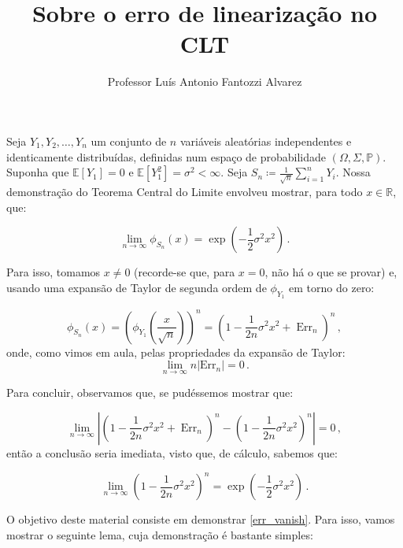 \documentclass[12pt,a4paper]{article}
\title{Sobre o erro de linearização no CLT}
\author{ Professor Luís Antonio Fantozzi Alvarez}
\begin{document}
	\maketitle
	Seja $Y_1,Y_2,\ldots, Y_n$ um conjunto de $n$ variáveis aleatórias independentes e identicamente distribuídas, definidas num espaço de probabilidade $(\Omega, \Sigma,\mathbb{P})$. Suponha que $\mathbb{E}[Y_1]=0$ e $\mathbb{E}[Y_1^2]=\sigma^2<\infty$. Seja $S_n \coloneqq \frac{1}{\sqrt{n}}\sum_{i=1}^n Y_i$.  Nossa demonstração do Teorema Central do Limite envolveu mostrar, para todo $x  \in \mathbb{R}$, que:
	
	$$\lim_{n \to \infty}\phi_{S_n}(x) = \exp\left(-\frac{1}{2} \sigma^2 x^2\right)\, .$$

Para isso, tomamos $x \neq 0$ (recorde-se que, para $x=0$, não há o que se provar) e, usando uma expansão de Taylor de segunda ordem de $\phi_{Y_1}$ em torno do zero:

$$\phi_{S_n}(x) = \left(\phi_{Y_1}\left(\frac{x}{\sqrt{n}}\right)\right)^n = \left(1 - \frac{1}{2n}\sigma^2 x^2 + \operatorname{Err}_n \right)^n\, ,$$
onde, como vimos em aula, pelas propriedades da expansão de Taylor:
$$\lim_{n \to \infty}n|\text{Err}_n| = 0\, .$$

Para concluir, observamos que, se pudéssemos mostrar que:

\begin{equation}
	\label{err_vanish}	
	\lim_{n\to \infty}\left|\left(1 - \frac{1}{2n}\sigma^2 x^2 + \operatorname{Err}_n \right)^n - \left(1 - \frac{1}{2n}\sigma^2 x^2\right)^n\right| = 0\, ,
\end{equation}
então a conclusão seria imediata, visto que, de cálculo, sabemos que:

$$\lim_{n\to \infty} \left(1 - \frac{1}{2n}\sigma^2 x^2\right)^n = \exp\left(-\frac{1}{2} \sigma^2 x^2\right)\, .$$

O objetivo deste material consiste em demonstrar \eqref{err_vanish}. Para isso, vamos mostrar o seguinte lema, cuja demonstração é bastante simples:
\end{document}
